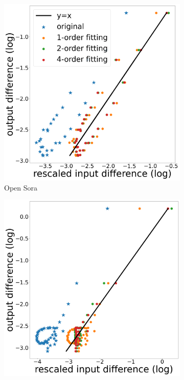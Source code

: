 \begin{figure}
    \centering
    \begin{minipage}{0.8\textwidth}
    \centering
    \begin{subfigure}{0.3\textwidth}
        \centering 
        \includegraphics[width=\textwidth]{figs/opensora_inference_fit_log_3.png} 
        \caption{Open Sora}
    \end{subfigure}
    \hfill
    \begin{subfigure}{0.3\textwidth}
        \centering
        \includegraphics[width=\textwidth]{figs/latte_inference_fit_log_3.png} 

\end{subfigure}
\end{minipage}
\end{figure}
